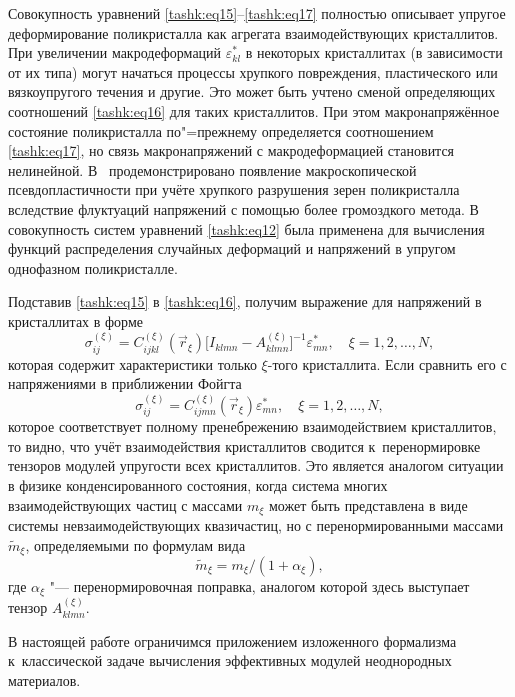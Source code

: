 Совокупность уравнений \eqref{tashk:eq15}--\eqref{tashk:eq17} полностью описывает упругое
деформирование поликристалла как агрегата взаимодействующих кристаллитов.
При увеличении макродеформаций $\varepsilon _{kl}^\ast$ в некоторых
кристаллитах (в зависимости от их типа) могут начаться процессы хрупкого
повреждения, пластического или вязкоупругого течения и другие. Это
может быть учтено сменой определяющих соотношений \eqref{tashk:eq16} для таких
кристаллитов. При этом макронапряжённое состояние поликристалла по"=прежнему
определяется соотношением \eqref{tashk:eq17}, но связь макронапряжений с макродеформацией
становится нелинейной. В~\cite{tashk:bib9} продемонстрировано появление макроскопической
псевдопластичности при учёте хрупкого разрушения зерен поликристалла
вследствие флуктуаций напряжений с помощью более громоздкого метода. В~\cite{tashk:bib10}
совокупность систем уравнений \eqref{tashk:eq12} была применена для вычисления функций
распределения случайных деформаций и напряжений в упругом однофазном
поликристалле.

Подставив \eqref{tashk:eq15} в \eqref{tashk:eq16}, получим выражение для напряжений в кристаллитах в
форме
\begin{equation}
\label{tashk:eq18}
\sigma _{ij}^{(\xi )} =C_{ijkl}^{(\xi )} (\vec {r}_\xi )
\bigl[ I_{klmn} -A_{klmn}^{(\xi )} \bigr]^{-1}\varepsilon _{mn}^\ast,\quad \xi =1, 2, \ldots,N,
\end{equation}
которая содержит характеристики только $\xi$-того кристаллита. 
Если сравнить его с напряжениями в приближении Фойгта 
\begin{equation}
\label{tashk:eq19}
\sigma _{ij}^{(\xi )} =C_{ijmn}^{(\xi )} (\vec {r}_\xi )\varepsilon _{mn}^\ast,\quad \xi =1, 2, \ldots,N,
\end{equation}
которое соответствует полному пренебрежению взаимодействием кристаллитов, то видно, что учёт взаимодействия кристаллитов сводится к~перенормировке тензоров модулей упругости всех кристаллитов. Это является аналогом ситуации в физике конденсированного состояния, когда система многих взаимодействующих частиц с массами $m_\xi$ может быть представлена в виде системы невзаимодействующих квазичастиц, но с перенормированными массами $\tilde {m}_\xi$, определяемыми по формулам вида 
$$\tilde {m}_\xi =m_\xi/ ( 1+\alpha _\xi ),$$ где $\alpha _\xi $ "--- перенормировочная поправка, аналогом которой здесь выступает тензор $A_{klmn}^{(\xi)}$.

В настоящей работе ограничимся приложением изложенного формализма к~классической задаче вычисления эффективных модулей неоднородных материалов.

